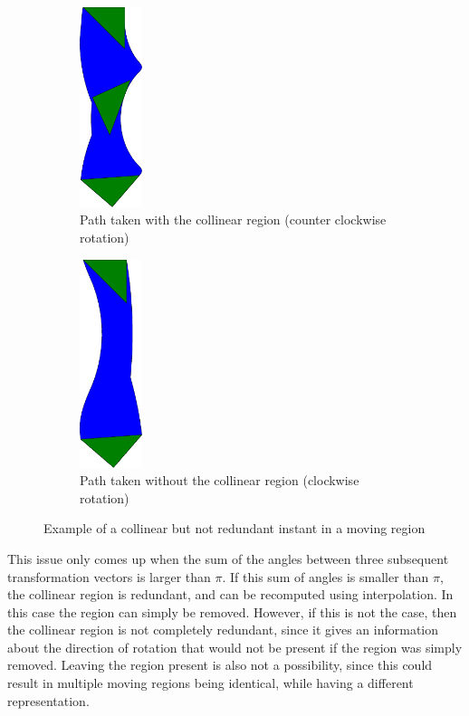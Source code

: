 \begin{figure}[h!]
    \centering
    \begin{subfigure}{.475\textwidth}
        \centering
        \includegraphics[width=0.2\textwidth]{images/collinear_not_redundant.pdf}
        \caption{Path taken with the collinear region (counter clockwise rotation)}
    \end{subfigure}
    \hfill
    \begin{subfigure}{.475\textwidth}
        \centering
        \includegraphics[width=0.2\textwidth]{images/collinear_not_redundant_2.pdf}
        \caption{Path taken without the collinear region (clockwise rotation)}
    \end{subfigure}
    \caption{Example of a collinear but not redundant instant in a moving region}
    \label{fig:collinear_not_redundant}
\end{figure}

This issue only comes up when the sum of the angles between three subsequent transformation vectors is larger than $\pi$. If this sum of angles is smaller than $\pi$, the collinear region is redundant, and can be recomputed using interpolation. In this case the region can simply be removed. However, if this is not the case, then the collinear region is not completely redundant, since it gives an information about the direction of rotation that would not be present if the region was simply removed. Leaving the region present is also not a possibility, since this could result in multiple moving regions being identical, while having a different representation.

